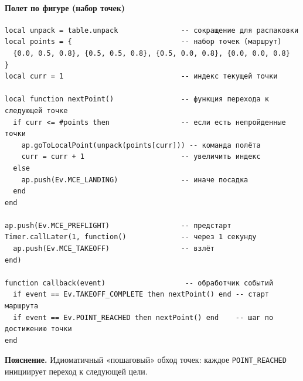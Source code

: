 \paragraph{Полет по фигуре (набор точек)}
\begin{verbatim}
local unpack = table.unpack               -- сокращение для распаковки
local points = {                          -- набор точек (маршрут)
  {0.0, 0.5, 0.8}, {0.5, 0.5, 0.8}, {0.5, 0.0, 0.8}, {0.0, 0.0, 0.8}
}
local curr = 1                            -- индекс текущей точки

local function nextPoint()                -- функция перехода к следующей точке
  if curr <= #points then                 -- если есть непройденные точки
    ap.goToLocalPoint(unpack(points[curr])) -- команда полёта
    curr = curr + 1                       -- увеличить индекс
  else
    ap.push(Ev.MCE_LANDING)               -- иначе посадка
  end
end

ap.push(Ev.MCE_PREFLIGHT)                 -- предстарт
Timer.callLater(1, function()             -- через 1 секунду
  ap.push(Ev.MCE_TAKEOFF)                 -- взлёт
end)

function callback(event)                   -- обработчик событий
  if event == Ev.TAKEOFF_COMPLETE then nextPoint() end -- старт маршрута
  if event == Ev.POINT_REACHED then nextPoint() end    -- шаг по достижению точки
end
\end{verbatim}
\textbf{Пояснение.} Идиоматичный «пошаговый» обход точек: каждое \texttt{POINT\_REACHED} инициирует переход к следующей цели.
